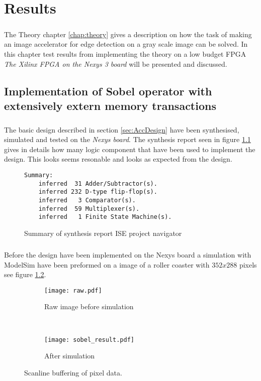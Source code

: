 \chapter{Results}
\label{chap:Results}
\paragraph*{}
The Theory chapter \ref{chap:theory} gives a description on how the task of making an image accelerator for edge detection on a gray scale image can be solved. In this chapter test results from implementing the theory on a low budget FPGA \textit{The Xilinx FPGA on the Nexys 3 board} will be presented and discussed.  

\section{Implementation of Sobel operator with extensively extern memory transactions}
\paragraph*{}
The basic design described in section \ref{sec:AccDesign} have been synthesised, simulated and tested on the \textit{Nexys board}. The synthesis report seen in figure \ref{fig:sum_synthesis_report} gives in details how many logic component that have been used to implement the design. This looks seems resonable and looks as expected from the design.  

\begin{figure}[H]
\centering
\begin{BVerbatim}
Summary:
    inferred  31 Adder/Subtractor(s).
    inferred 232 D-type flip-flop(s).
    inferred   3 Comparator(s).
    inferred  59 Multiplexer(s).
    inferred   1 Finite State Machine(s).
\end{BVerbatim}
\caption{Summary of synthesis report ISE project navigator}
\label{fig:sum_synthesis_report}
\end{figure}

\paragraph*{}
Before the design have been implemented on the Nexys board a simulation with ModelSim have been preformed on a image of a roller coaster with $352x288$ pixels see figure \ref{fig:test_picture_raw}. 

\begin{figure}[H]
	\centering
	\begin{subfigure}[b]{0.4\textwidth}
		\texttt{[image: raw.pdf]}
		\caption{Raw image before simulation}
		\label{fig:test_picture_raw}
    \end{subfigure}%
        ~ %
    \begin{subfigure}[b]{0.4\textwidth}
    	\texttt{[image: sobel\_result.pdf]}
    	\caption{After simulation}
    	\label{fig:test_picture_sobel}
	\end{subfigure}
	\caption{Scanline buffering of pixel data.}
\end{figure}

